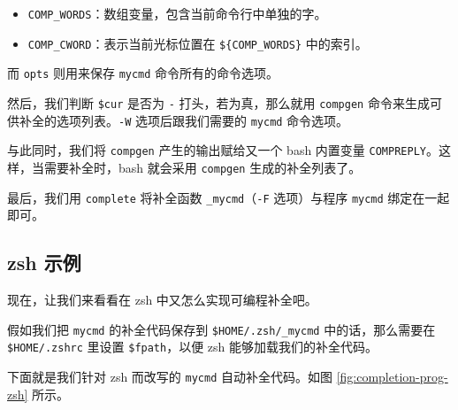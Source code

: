 \documentclass[]{ctexbook}
\newenvironment{Shaded}{\begin{snugshade}}{\end{snugshade}}
\newcommand{\BuiltInTok}[1]{#1}
\newcommand{\CommentTok}[1]{\textcolor[rgb]{0.56,0.35,0.01}{\textit{#1}}}
\newcommand{\ExtensionTok}[1]{#1}
\newcommand{\FunctionTok}[1]{\textcolor[rgb]{0.00,0.00,0.00}{#1}}
\newcommand{\KeywordTok}[1]{\textcolor[rgb]{0.13,0.29,0.53}{\textbf{#1}}}
\newcommand{\NormalTok}[1]{#1}
\newcommand{\OtherTok}[1]{\textcolor[rgb]{0.56,0.35,0.01}{#1}}
\newcommand{\StringTok}[1]{\textcolor[rgb]{0.31,0.60,0.02}{#1}}
\newcommand{\VariableTok}[1]{\textcolor[rgb]{0.00,0.00,0.00}{#1}}
\providecommand{\tightlist}{%
  \setlength{\itemsep}{0pt}\setlength{\parskip}{0pt}}
\begin{document}
\begin{itemize}
\tightlist
\item
  \texttt{COMP\_WORDS}：数组变量，包含当前命令行中单独的字。
\item
  \texttt{COMP\_CWORD}：表示当前光标位置在 \texttt{\$\{COMP\_WORDS\}} 中的索引。
\end{itemize}

而 \texttt{opts} 则用来保存 \texttt{mycmd} 命令所有的命令选项。

然后，我们判断 \texttt{\$cur} 是否为 \texttt{-} 打头，若为真，那么就用 \texttt{compgen} 命令来生成可供补全的选项列表。\texttt{-W} 选项后跟我们需要的 \texttt{mycmd} 命令选项。

与此同时，我们将 \texttt{compgen} 产生的输出赋给又一个 bash 内置变量 \texttt{COMPREPLY}。这样，当需要补全时，bash 就会采用 \texttt{compgen} 生成的补全列表了。

最后，我们用 \texttt{complete} 将补全函数 \texttt{\_mycmd}（\texttt{-F} 选项）与程序 \texttt{mycmd} 绑定在一起即可。

\hypertarget{zsh-ux793aux4f8b}{%
\subsection{zsh 示例}\label{zsh-ux793aux4f8b}}

现在，让我们来看看在 zsh 中又怎么实现可编程补全吧。

假如我们把 \texttt{mycmd} 的补全代码保存到 \texttt{\$HOME/.zsh/\_mycmd} 中的话，那么需要在 \texttt{\$HOME/.zshrc} 里设置 \texttt{\$fpath}，以便 zsh 能够加载我们的补全代码。

\begin{Shaded}
\end{Shaded}

下面就是我们针对 zsh 而改写的 \texttt{mycmd} 自动补全代码。如图 \ref{fig:completion-prog-zsh} 所示。

\begin{Shaded}
\end{Shaded}
\end{document}
